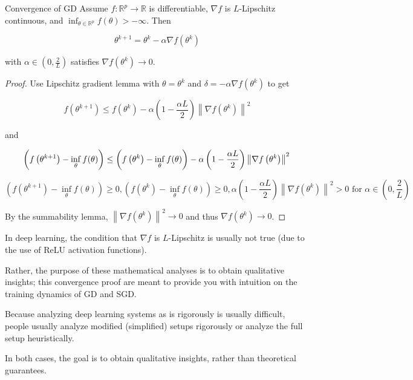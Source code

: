 \begin{frame}[allowframebreaks]

\begin{mytheoremblock}{2.6}{Convergence of GD}
    Assume $f: \mathbb{R}^{p} \rightarrow \mathbb{R}$ is differentiable, $\nabla f$ is $L$-Lipschitz continuous, and $\inf _{\theta \in \mathbb{R}^{p}} f(\theta)>-\infty$. Then

    $$
    \theta^{k+1}=\theta^{k}-\alpha \nabla f\left(\theta^{k}\right)
    $$

    with $\alpha \in\left(0, \frac{2}{L}\right)$ satisfies $\nabla f\left(\theta^{k}\right) \rightarrow 0$.

    \begin{proof}
        Use Lipschitz gradient lemma with $\theta=\theta^{k}$ and $\delta=-\alpha \nabla f\left(\theta^{k}\right)$ to get

        $$
        f\left(\theta^{k+1}\right) \leq f\left(\theta^{k}\right)-\alpha\left(1-\frac{\alpha L}{2}\right)\left\|\nabla f\left(\theta^{k}\right)\right\|^{2}
        $$

        and

        $$
        \left(f\left(\theta^{k+1}\right)-\inf _{\theta} f(\theta)\right) \leq\left(f\left(\theta^{k}\right)-\inf _{\theta} f(\theta)\right)-\alpha\left(1-\frac{\alpha L}{2}\right)\left\|\nabla f\left(\theta^{k}\right)\right\|^{2} \\
        $$

        $$
        \left(f\left(\theta^{k+1}\right)-\inf _{\theta} f(\theta)\right) \ge 0, 
        \left(f\left(\theta^{k}\right)-\inf _{\theta} f(\theta)\right) \ge 0, 
        \alpha\left(1-\frac{\alpha L}{2}\right)\left\|\nabla f\left(\theta^{k}\right)\right\|^{2} > 0 \text{ for } \alpha \in\left(0, \frac{2}{L}\right)
        $$

        By the summability lemma, $\left\|\nabla f\left(\theta^{k}\right)\right\|^{2} \rightarrow 0$ and thus $\nabla f\left(\theta^{k}\right) \rightarrow 0$.
    \end{proof}
\end{mytheoremblock}

\end{frame}


\begin{frame}[allowframebreaks]

In deep learning, the condition that $\nabla f$ is $L$-Lipschitz is usually not true (due to the use of ReLU activation functions).

Rather, the purpose of these mathematical analyses is to obtain qualitative insights; this convergence proof are meant to provide you with intuition on the training dynamics of GD and SGD.

Because analyzing deep learning systems as is rigorously is usually difficult, people usually analyze modified (simplified) setups rigorously or analyze the full setup heuristically.

In both cases, the goal is to obtain qualitative insights, rather than theoretical guarantees.

\end{frame}

